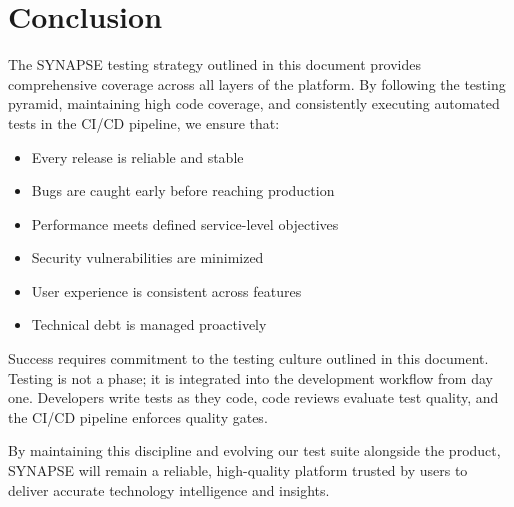 \documentclass{report}
\begin{document}
\chapter{Conclusion}

The SYNAPSE testing strategy outlined in this document provides comprehensive coverage across all layers of the platform. By following the testing pyramid, maintaining high code coverage, and consistently executing automated tests in the CI/CD pipeline, we ensure that:

\begin{itemize}
  \item Every release is reliable and stable
  \item Bugs are caught early before reaching production
  \item Performance meets defined service-level objectives
  \item Security vulnerabilities are minimized
  \item User experience is consistent across features
  \item Technical debt is managed proactively
\end{itemize}

Success requires commitment to the testing culture outlined in this document. Testing is not a phase; it is integrated into the development workflow from day one. Developers write tests as they code, code reviews evaluate test quality, and the CI/CD pipeline enforces quality gates.

By maintaining this discipline and evolving our test suite alongside the product, SYNAPSE will remain a reliable, high-quality platform trusted by users to deliver accurate technology intelligence and insights.
\end{document}
